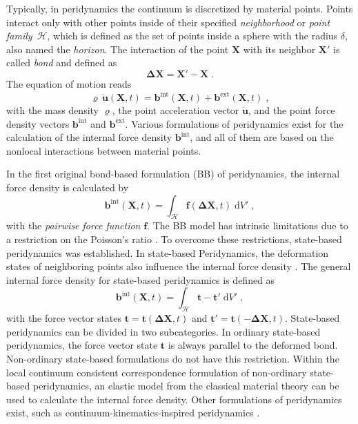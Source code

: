 \documentclass{juliacon}
\newcommand{\vb}{\boldsymbol}
\begin{document}
Typically, in peridynamics the continuum is discretized by material points.
Points interact only with other points inside of their specified \emph{neighborhood} or \emph{point family}~$\mathcal{H}$, which is defined as the set of points inside a sphere with the radius $\delta$, also named the \emph{horizon}.
The interaction of the point $\vb{X}$ with its neighbor $\vb{X}'$ is called \emph{bond} and defined as
\begin{equation}
\vb{\Delta X} = \vb{X}' - \vb{X} \; .
\end{equation}
The equation of motion reads
\begin{equation}
\varrho \, \vb{\ddot{u}}(\vb{X},t) = \vb{b}^{\mathrm{int}}(\vb{X},t) + \vb{b}^{\mathrm{ext}}(\vb{X},t) \; ,
\end{equation} 
with the mass density $\varrho$, the point acceleration vector $\vb{\ddot{u}}$, and the point force density vectors $\vb{b}^{\mathrm{int}}$ and $\vb{b}^{\mathrm{ext}}$.
Various formulations of peridynamics exist for the calculation of the internal force density $\vb{b}^{\mathrm{int}}$, and all of them are based on the nonlocal interactions between material points.

In the first original bond-based formulation (BB) of peridynamics, the internal force density is calculated by
\begin{equation}
\vb{b}^{\mathrm{int}}(\vb{X},t) = \int_\mathcal{H} \vb{f}(\vb{\Delta X}, t) \; \mathrm{d}V' \; ,
\end{equation}
with the \emph{pairwise force function} $\vb{f}$.
The BB model has intrinsic limitations due to a restriction on the Poisson's ratio \cite{Silling2007,Trageser2020}.
To overcome these restrictions, state-based peridynamics was established.
In state-based Peridynamics, the deformation states of neighboring points also influence the internal force density \cite{Silling2007}.
The general internal force density for state-based peridynamics is defined as
\begin{equation}
\vb{b}^{\mathrm{int}} (\vb{X},t) = \int_\mathcal{H} \vb{t} - \vb{t}' \; \mathrm{d}V' \; ,
\end{equation}
with the force vector states $\vb{t}=\vb{t}(\vb{\Delta X}, t)$ and $\vb{t}'=\vb{t}(-\vb{\Delta X}, t)$.
State-based peridynamics can be divided in two subcategories.
In ordinary state-based peridynamics, the force vector state $\vb{t}$ is always parallel to the deformed bond.
Non-ordinary state-based formulations do not have this restriction.
Within the local continuum consistent correspondence formulation of non-ordinary state-based peridynamics, an elastic model from the classical material theory can be used to calculate the internal force density.
Other formulations of peridynamics exist, such as continuum-kinematics-inspired peridynamics \cite{Javili2019}.
\end{document}
